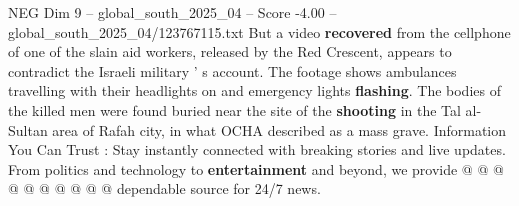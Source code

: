 \begin{textsample}{NEG Dim 9 – global\_south\_2025\_04 – Score -4.00 – global\_south\_2025\_04/123767115.txt}
But a video \textbf{recovered} from the cellphone of one of the slain aid workers, released by the Red Crescent, appears to contradict the Israeli military ' s account.
The footage shows ambulances travelling with their headlights on and emergency lights \textbf{flashing}.
The bodies of the killed men were found buried near the site of the \textbf{shooting} in the Tal al-Sultan area of Rafah city, in what OCHA described as a mass grave.
Information You Can Trust : Stay instantly connected with breaking stories and live updates.
From politics and technology to \textbf{entertainment} and beyond, we provide @ @ @ @ @ @ @ @ @ @ dependable source for 24/7 news.

\end{textsample}
